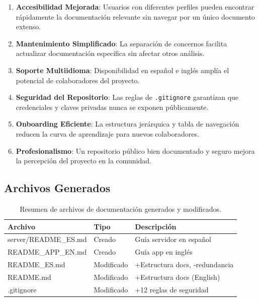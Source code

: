 \documentclass[12pt,a4paper]{article}
\begin{document}
\begin{enumerate}
    \item \textbf{Accesibilidad Mejorada}: Usuarios con diferentes perfiles pueden encontrar rápidamente la documentación relevante sin navegar por un único documento extenso.
    
    \item \textbf{Mantenimiento Simplificado}: La separación de concernos facilita actualizar documentación específica sin afectar otros análisis.
    
    \item \textbf{Soporte Multiidioma}: Disponibilidad en español e inglés amplía el potencial de colaboradores del proyecto.
    
    \item \textbf{Seguridad del Repositorio}: Las reglas de \texttt{.gitignore} garantizan que credenciales y claves privadas nunca se exponen públicamente.
    
    \item \textbf{Onboarding Eficiente}: La estructura jerárquica y tabla de navegación reducen la curva de aprendizaje para nuevos colaboradores.
    
    \item \textbf{Profesionalismo}: Un repositorio público bien documentado y seguro mejora la percepción del proyecto en la comunidad.
\end{enumerate}

\subsection{Archivos Generados}

\begin{table}[h]
    \centering
    \small
    \begin{tabular}{|l|l|l|}
    \hline
    \textbf{Archivo} & \textbf{Tipo} & \textbf{Descripción} \\
    \hline
    server/README\_ES.md & Creado & Guía servidor en español \\
    README\_APP\_EN.md & Creado & Guía app en inglés \\
    README\_ES.md & Modificado & +Estructura docs, -redundancia \\
    README.md & Modificado & +Estructura docs (English) \\
    .gitignore & Modificado & +12 reglas de seguridad \\
    \hline
    \end{tabular}
    \caption{Resumen de archivos de documentación generados y modificados.}
    \label{tab:archivos_generados}
\end{table}
\end{document}
